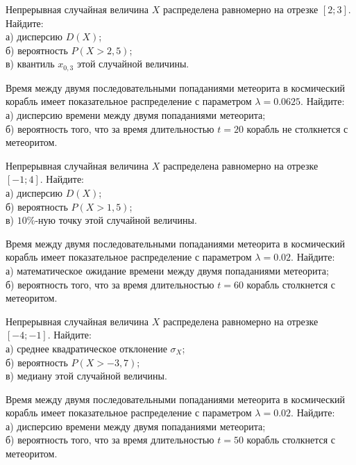 \vfill

\newpage\setcounter{zad}{0}

\z Непрерывная случайная величина $X$ распределена равномерно на отрезке $[2; 3]$. Найдите: \\ \quad а) дисперсию $D(X)$; \\ \quad б) вероятность $P(X>2{,}5)$; \\ \quad в) квантиль $x_{0{,}3}$ этой случайной величины.


\vfill

\z Время между двумя последовательными попаданиями метеорита в космический корабль имеет показательное распределение с параметром $\lambda = 0.0625$. Найдите: \\ \quad а) дисперсию времени между двумя попаданиями метеорита; \\ \quad б) вероятность того, что за время длительностью $t = 20$ корабль не столкнется с метеоритом.
 

\vfill

\newpage\setcounter{zad}{0}

\z Непрерывная случайная величина $X$ распределена равномерно на отрезке $[-1; 4]$. Найдите: \\ \quad а) дисперсию $D(X)$; \\ \quad б) вероятность $P(X>1{,}5)$; \\ \quad в) $10\%$-ную точку этой случайной величины.


\vfill

\z Время между двумя последовательными попаданиями метеорита в космический корабль имеет показательное распределение с параметром $\lambda = 0.02$. Найдите: \\ \quad а) математическое ожидание времени между двумя попаданиями метеорита; \\ \quad б) вероятность того, что за время длительностью $t = 60$ корабль  столкнется с метеоритом.
 

\vfill

\newpage\setcounter{zad}{0}

\z Непрерывная случайная величина $X$ распределена равномерно на отрезке $[-4; -1]$. Найдите: \\ \quad а) среднее квадратическое отклонение $\sigma_X$; \\ \quad б) вероятность $P(X>-3{,}7)$; \\ \quad в) медиану этой случайной величины.


\vfill

\z Время между двумя последовательными попаданиями метеорита в космический корабль имеет показательное распределение с параметром $\lambda = 0.02$. Найдите: \\ \quad а) дисперсию времени между двумя попаданиями метеорита; \\ \quad б) вероятность того, что за время длительностью $t = 50$ корабль  столкнется с метеоритом.
 

